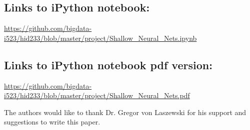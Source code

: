 \subsection{Links to iPython notebook:}
\url{https://github.com/bigdata-i523/hid233/blob/master/project/Shallow_Neural_Nets.ipynb}

\subsection{Links to iPython notebook pdf version:}
\url{https://github.com/bigdata-i523/hid233/blob/master/project/Shallow_Neural_Nets.pdf}


\begin{acks}

  The authors would like to thank Dr. Gregor von Laszewski for his
  support and suggestions to write this paper.

\end{acks}


 

